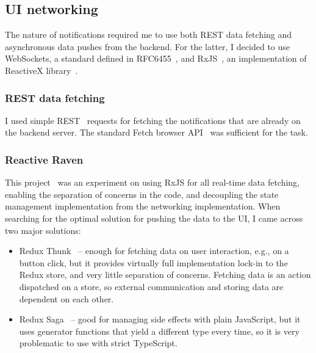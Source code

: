 \subsection{UI networking}\label{sec:ui-networking}

The nature of notifications required me to use
both REST data fetching and asynchronous data pushes from the backend.
For the latter, I decided to use WebSockets,
a standard defined in RFC6455~\cite{fette_rfc6455_2011}, and
RxJS~\cite{lesh_rxjs_2022}, an implementation of
ReactiveX library~\cite{gross_reactivex_2021}.

\subsubsection{REST data fetching}\label{sec:rest-data-fetching}

I used simple REST~\cite{perrier_rest_2022} requests
for fetching the notifications
that are already on the backend server.
The standard Fetch browser API~\cite{perrier_fetch_2022}
was sufficient for the task.

\subsubsection{Reactive Raven}\label{sec:reactive-raven}

This project~\cite{sewera_reactive_2022} was an experiment
on using RxJS for all real-time data fetching,
enabling the separation of concerns in the code,
and decoupling the state management implementation
from the networking implementation.
When searching for the optimal solution for pushing the data to the UI,
I came across two major solutions:

\begin{itemize}
      \item
            Redux Thunk~\cite{gaeraon_redux_2022-1} --
            enough for fetching data on user interaction,
            e.g., on a button click,
            but it provides virtually full implementation lock-in
            to the Redux store, and very little separation of concerns.
            Fetching data is an action dispatched on a store,
            so external communication and storing data are dependent on each other.
      \item
            Redux Saga~\cite{elouafi_redux_2022} --
            good for managing side effects with plain JavaScript,
            but it uses generator functions
            that yield a different type every time,
            so it is very problematic to use with strict TypeScript.
\end{itemize}

